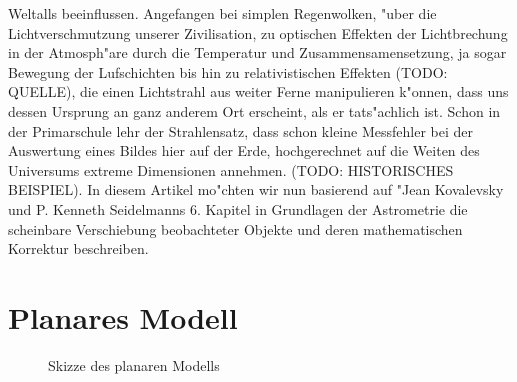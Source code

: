 Weltalls beeinflussen. Angefangen bei simplen Regenwolken, "uber die Lichtverschmutzung unserer Zivilisation, zu optischen Effekten der Lichtbrechung in der Atmosph"are durch die Temperatur 
und Zusammensamensetzung, ja sogar Bewegung der Lufschichten bis hin zu relativistischen Effekten (TODO: QUELLE), die einen Lichtstrahl aus weiter Ferne manipulieren k"onnen, 
dass uns dessen Ursprung an ganz anderem Ort erscheint, als er tats"achlich ist. Schon in der Primarschule lehr der Strahlensatz, dass schon kleine Messfehler bei der Auswertung 
eines Bildes hier auf der Erde, hochgerechnet auf die Weiten des Universums extreme Dimensionen annehmen. (TODO: HISTORISCHES BEISPIEL). 
In diesem Artikel mo"chten wir nun basierend auf "Jean Kovalevsky und P. Kenneth Seidelmanns 6. Kapitel in Grundlagen der Astrometrie die scheinbare Verschiebung 
beobachteter Objekte und deren mathematischen Korrektur beschreiben. 

\section{Planares Modell}
\begin{figure}
\centering
{}
\caption{Skizze des planaren Modells}
\label{fig:13_1}
\end{figure}


